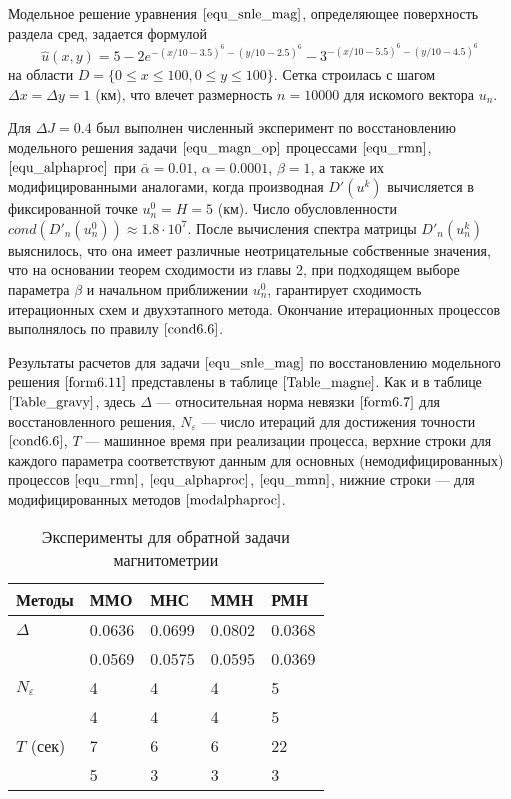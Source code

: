 Модельное решение уравнения $\eqref{equ_snle_mag}$, определяющее поверхность раздела сред, задается формулой
\begin{equation}\label{form6.11}
\hat{u}(x,y)=5-2e^{-(x/10-3.5)^6-(y/10-2.5)^6}-
3^{-(x/10-5.5)^6-(y/10-4.5)^6}
\end{equation}
на области $D=\{0\le x \le 100, 0\le y\le 100\}$. Сетка строилась с шагом $\Delta x=\Delta y = 1$ (км), что влечет размерность $n=10000$ для искомого вектора $u_n$.

Для $\Delta J=0.4$  был выполнен численный эксперимент по восстановлению модельного решения задачи $\eqref{equ_magn_op}$ процессами $\eqref{equ_rmn}$, $\eqref{equ_alphaproc}$ при $\bar\alpha=0.01$, $\alpha = 0.0001$, $\beta=1$, а также их модифицированными аналогами, когда производная $D'(u^k)$ вычисляется в фиксированной точке $u_n^0=H=5$ (км). Число обусловленности $cond(D'_n(u_n^0))\approx 1.8\cdot 10^7$. После вычисления спектра матрицы $D'_n(u_n^k)$ выяснилось, что она имеет различные неотрицательные собственные значения, что на основании теорем сходимости из главы 2, при подходящем выборе параметра $\beta$ и начальном приближении $u_n^0$, гарантирует сходимость итерационных схем и двухэтапного метода. Окончание итерационных процессов выполнялось по правилу $\eqref{cond6.6}$.

Результаты расчетов для задачи $\eqref{equ_snle_mag}$ по восстановлению модельного решения $\eqref{form6.11}$ представлены в таблице $\ref{Table_magne}$. Как и в таблице $\ref{Table_gravy}$, здесь $\Delta$ --- относительная норма невязки $\eqref{form6.7}$ для восстановленного решения, $N_\varepsilon$ --- число итераций для достижения точности $\eqref{cond6.6}$, $T$ --- машинное время при реализации процесса, верхние строки для каждого параметра соответствуют данным для основных (немодифицированных) процессов $\eqref{equ_rmn}$, $\eqref{equ_alphaproc}$, $\eqref{equ_mmn}$, нижние строки --- для модифицированных методов $\eqref{modalphaproc}$.
\begin{table}[H]
	\centering
	\caption{Эксперименты для обратной задачи магнитометрии}
	\label{Table_magne}
	\begin{tabular}{|p{}|p{}|p{}|p{}|p{}|}
		\hline
		\rule{0cm}{0.5cm}
		\textbf{Методы} & \textbf{ММО} & \textbf{МНС} & \textbf{ММН} & \textbf{РМН} \\ \hline
		\rule{0cm}{0.5cm}
		{$\Delta$} & 0.0636 & 0.0699 & 0.0802 & 0.0368	 \\ \cline{2-5} 
		\rule{0cm}{0.5cm}
		&  0.0569   & 0.0575    &  0.0595   &  0.0369   \\ \hline
		\rule{0cm}{0.5cm}
		{$N_\varepsilon$} & 4  &  4   &   4  &  5    \\ \cline{2-5}
		\rule{0cm}{0.5cm}
		&  4   &   4  &  4   &  5   \\ \hline
		\rule{0cm}{0.5cm}
		{$T$ (сек)}    &  7   &  6   &  6  & 22    \\ \cline{2-5}
		\rule{0cm}{0.5cm}
		& 5    & 3    &  3   &   3  \\ \hline
	\end{tabular}
\end{table}

